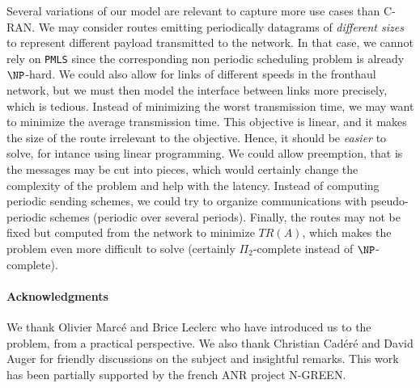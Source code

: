 \documentclass[a4paper,10pt]{article}
\newcommand\PMLS{\texttt{PMLS}\xspace}
\begin{document}
   	Several variations of our model are relevant to capture more use cases than C-RAN. 
   	We may consider routes emitting  periodically datagrams of \emph{different sizes} to represent different payload transmitted to the network. In that case, we cannot rely on \PMLS since the corresponding non periodic scheduling problem is already $\NP$-hard. 
   	We could also allow for links of different speeds in the fronthaul network, but we must then model
   	the interface between links more precisely, which is tedious.
	Instead of minimizing the worst transmission time, we may want to minimize the average transmission time. This objective is linear, and it makes the size of the route irrelevant to the objective. Hence, it should be \emph{easier} to solve, for intance using linear programming. We could allow preemption, that is the messages may be cut into pieces, which would certainly change the complexity of the problem and help with the latency.  
   	Instead of computing periodic sending schemes, we could try to organize communications with pseudo-periodic schemes (periodic over several periods). Finally, the routes may not be fixed but computed from the network to minimize $TR(A)$, which makes the problem even more difficult to solve (certainly $\Pi_2$-complete instead of $\NP$-complete). 



 	\paragraph*{Acknowledgments} 
 	We thank Olivier Marcé and Brice Leclerc who have introduced us to the problem, from a practical perspective. We also thank Christian Cad\'er\'e and David Auger for friendly discussions on the subject and insightful remarks. This work has been partially supported by the french ANR project N-GREEN.



\end{document}
